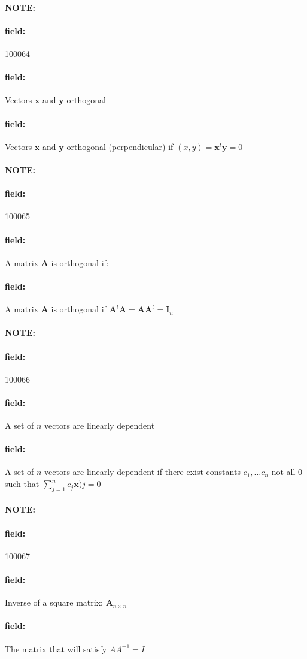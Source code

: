\documentclass[12pt]{article}
\newenvironment{note}{\paragraph{NOTE:}}{}
\newenvironment{field}{\paragraph{field:}}{}
\begin{document}


\begin{note} \begin{field} \tiny 100064 \end{field}
 \begin{field}
  Vectors $\mathbf{x}$ and $\mathbf{y}$ orthogonal
 \end{field}
 \begin{field}
  Vectors $\mathbf{x}$ and $\mathbf{y}$ orthogonal (perpendicular) if $(x,y) = \mathbf{x}^t \mathbf{y} = 0$
 \end{field}
\end{note}

\begin{note} \begin{field} \tiny 100065 \end{field}
 \begin{field}
  A matrix $\mathbf{A}$ is orthogonal if:
 \end{field}
 \begin{field}
  A matrix $\mathbf{A}$ is orthogonal if $\mathbf{A}^t \mathbf{A} = \mathbf{A} \mathbf{A}^t = \mathbf{I}_n$
 \end{field}
\end{note}

\begin{note} \begin{field} \tiny 100066 \end{field}
 \begin{field}
  A set of $n$ vectors are linearly dependent
 \end{field}
 \begin{field}
  A set of $n$ vectors are linearly dependent if there exist constants $c_1, \ldots c_n$ not all 0 such that $\sum_{j=1}^n c_j \mathbf{x})j = 0$
 \end{field}
\end{note}

\begin{note} \begin{field} \tiny 100067 \end{field}
 \begin{field}
  Inverse of a square matrix: $\mathbf{A}_{n\times n}$
 \end{field}
 \begin{field}
  The matrix that will satisfy $AA^{-1} = I$
 \end{field}
\end{note}
\end{document}
